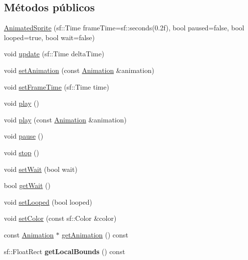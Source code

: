 \subsection*{Métodos públicos}
\begin{DoxyCompactItemize}
\item 
\hyperlink{classAnimatedSprite_a14c50aaf795c217f187f839d6cca9c76}{Animated\+Sprite} (sf\+::\+Time frame\+Time=sf\+::seconds(0.\+2f), bool paused=false, bool looped=true, bool wait=false)
\item 
void \hyperlink{classAnimatedSprite_a17a41ff812631a9d8947d272933d6696}{update} (sf\+::\+Time delta\+Time)
\item 
void \hyperlink{classAnimatedSprite_ab1afc57d90d57a0c4bc4f5b090f2dacf}{set\+Animation} (const \hyperlink{classAnimation}{Animation} \&animation)
\item 
void \hyperlink{classAnimatedSprite_af598fab5c3599ccc5ed1e2d4fefa68cc}{set\+Frame\+Time} (sf\+::\+Time time)
\item 
void \hyperlink{classAnimatedSprite_a203b968f1cb374cca5dbc89716174020}{play} ()
\item 
void \hyperlink{classAnimatedSprite_a9ea345649a4e012d096bc04aafe1ecb0}{play} (const \hyperlink{classAnimation}{Animation} \&animation)
\item 
void \hyperlink{classAnimatedSprite_a48384db59427423b5c1d98f6ee94fe45}{pause} ()
\item 
void \hyperlink{classAnimatedSprite_af9734f4346d3d2370322b2dcaeef133c}{stop} ()
\item 
void \hyperlink{classAnimatedSprite_af38c7271d7cd9af432952de2728f8fc9}{set\+Wait} (bool wait)
\item 
bool \hyperlink{classAnimatedSprite_a67698a0da51b5d4e008d1a9a33209603}{get\+Wait} ()
\item 
void \hyperlink{classAnimatedSprite_a855a5a48ea2e1c51c7c9304857dd2f8c}{set\+Looped} (bool looped)
\item 
void \hyperlink{classAnimatedSprite_a1a96a0f6570efddd2eb26f89bc5b6f50}{set\+Color} (const sf\+::\+Color \&color)
\item 
const \hyperlink{classAnimation}{Animation} $\ast$ \hyperlink{classAnimatedSprite_ad1f89db42fe276e8c8f603d5a501d1ed}{get\+Animation} () const 
\item 
\hypertarget{classAnimatedSprite_ab85f8836a5e03ba9b954243acd38556f}{}sf\+::\+Float\+Rect {\bfseries get\+Local\+Bounds} () const \label{classAnimatedSprite_ab85f8836a5e03ba9b954243acd38556f}


\end{DoxyCompactItemize}
